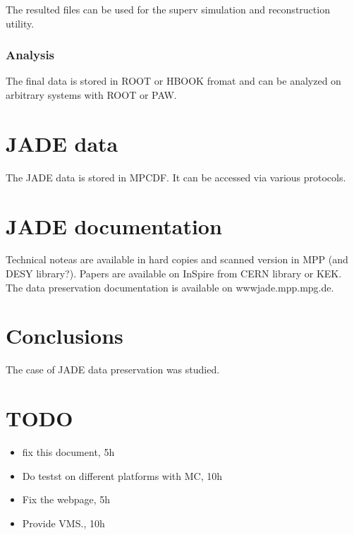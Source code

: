The resulted files can be used for the superv simulation and reconstruction utility.
\subsubsection{Analysis}
The final  data  is stored in ROOT or HBOOK fromat  and can be analyzed on arbitrary systems with ROOT or PAW.



\section{JADE data}
The JADE data is stored in MPCDF.
It can be accessed via various protocols.

\section{JADE documentation}
Technical noteas are available in hard copies and scanned version in MPP (and DESY library?).
Papers are available on InSpire from CERN library or KEK.
The data preservation documentation is available on wwwjade.mpp.mpg.de.

\section{Conclusions}
The case of JADE data preservation was studied.

\section{TODO}
\begin{itemize}
\item fix this document, 5h
\item Do testst on different platforms with MC, 10h
\item Fix the webpage, 5h
\item Provide VMS., 10h
\end{itemize}



